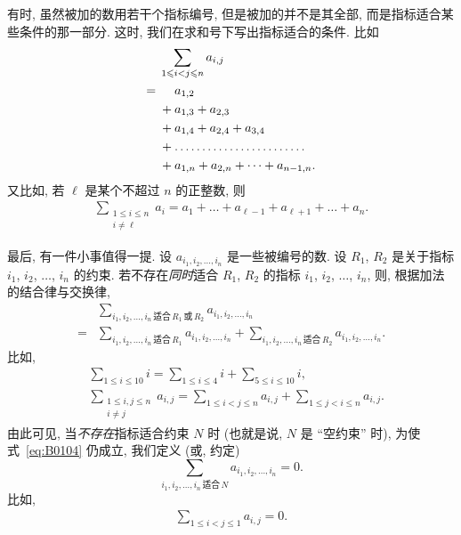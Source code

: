有时, 虽然被加的数用若干个指标编号,
但是被加的并不是其全部,
而是指标适合某些条件的那一部分.
这时, 我们在求和号下写出指标适合的条件.
比如
\begin{align*}
         & \sum_{1 \leq i < j \leq n} {a_{i,j}}
    \\
    = {} & \hphantom{{} + {}} a_{1,2}
    \\
         & + a_{1,3} + a_{2,3}
    \\
         & + a_{1,4} + a_{2,4} + a_{3,4}
    \\
         & +
    \dots \dots \dots \dots
    \dots \dots \dots \dots
    \\
         & + a_{1,n} + a_{2,n} + \dots + a_{n-1,n}.
\end{align*}
又比如, 若 \(\ell\) 是某个不超过 \(n\) 的正整数, 则
\begin{align*}
    \sum_{\substack{1 \leq i \leq n \\i \neq \ell}}
    {a_i}
    = a_1 + \dots + a_{\ell-1} + a_{\ell+1} + \dots + a_n.
\end{align*}

最后, 有一件小事值得一提.
设 \(a_{i_1, i_2, \dots, i_n}\) 是一些被编号的数.
设 \(R_1\), \(R_2\)
是关于指标 \(i_1\), \(i_2\), \(\dots\), \(i_n\) 的约束.
若不存在\emph{同时}适合 \(R_1\), \(R_2\)
的指标 \(i_1\), \(i_2\), \(\dots\), \(i_n\),
则, 根据加法的结合律与交换律,
\begin{equation}
    \begin{aligned}
             & \sum_{i_1,i_2,\dots,i_n
            \,\text{适合}\,R_1\,\text{或}\,R_2}
        {a_{i_1, i_2, \dots, i_n}}
        \\
        = {} & \sum_{i_1,i_2,\dots,i_n\,\text{适合}\,R_1}
        {a_{i_1, i_2, \dots, i_n}}
        + \sum_{i_1,i_2,\dots,i_n\,\text{适合}\,R_2}
        {a_{i_1, i_2, \dots, i_n}}.
    \end{aligned}
    \label{eq:B0104}
\end{equation}
比如,
\begin{align*}
     & \sum_{1 \leq i \leq 10} {i}
    = \sum_{1 \leq i \leq 4} {i}
    + \sum_{5 \leq i \leq 10} {i},
    \\
     & \sum_{\substack{1 \leq i, j \leq n \\i \neq j}} {a_{i,j}}
    = \sum_{1 \leq i < j \leq n} {a_{i,j}}
    + \sum_{1 \leq j < i \leq n} {a_{i,j}}.
\end{align*}
由此可见, 当\emph{不存在}指标适合约束 \(N\) 时
(也就是说, \(N\) 是 ``空约束'' 时),
为使式~\eqref{eq:B0104} 仍成立,
我们定义 (或, 约定)
\begin{equation}
    \sum_{i_1,i_2,\dots,i_n\,\text{适合}\,N}
    {a_{i_1, i_2, \dots, i_n}} = 0.
    \label{eq:B0105}
\end{equation}
比如,
\begin{align*}
    \sum_{1 \leq i < j \leq 1} {a_{i,j}} = 0.
\end{align*}

